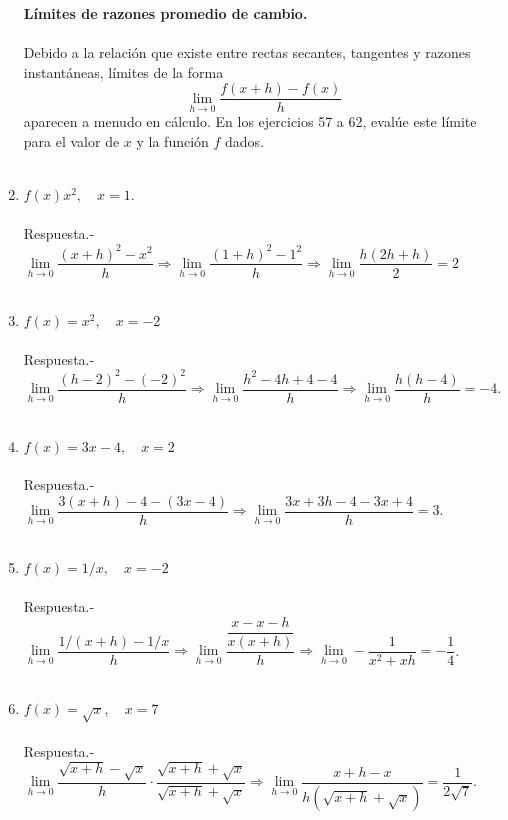 \begin{enumerate}
\textbf{Límites de razones promedio de cambio.}\\\\
Debido a la relación que existe entre rectas secantes, tangentes y razones instantáneas, límites de la forma
$$\lim\limits_{h\to 0}\dfrac{f(x + h) - f(x)}{h}$$
aparecen a menudo en cálculo. En los ejercicios 57 a 62, evalúe este
límite para el valor de $x$ y la función $f$ dados.\\\\

\item $f(x)x^2, \quad x=1$.\\\\
    Respuesta.-\; $\lim\limits_{h\to 0} \dfrac{(x+h)^2-x^2}{h} \Longrightarrow \lim\limits_{h\to 0} \dfrac{(1+h)^2-1^2}{h} \Longrightarrow \lim\limits_{h\to 0} \dfrac{h(2h+h)}{2} = 2$\\\\

\item $f(x) = x^2, \quad x=-2$\\\\
    Respuesta.-\; $\lim\limits_{h\to 0} \dfrac{(h-2)^2 - (-2)^2}{h} \Longrightarrow \lim\limits_{h\to 0} \dfrac{h^2 - 4h + 4 - 4}{h} \Longrightarrow \lim\limits_{h \to 0} \dfrac{h(h-4)}{h} = -4$.\\\\ 

\item $f(x) = 3x-4, \quad x=2$\\\\
    Respuesta.-\; $\lim\limits_{h\to 0} \dfrac{3(x+h)-4 -(3x-4)}{h} \Longrightarrow \lim\limits_{h\to 0} \dfrac{3x+3h - 4 -3x + 4}{h} = 3$.\\\\ 

\item $f(x) = 1/x , \quad x=-2$\\\\
    Respuesta.-\; $\lim\limits_{h\to 0} \dfrac{1/(x+h) - 1/x}{h} \Longrightarrow \lim\limits_{h\to 0} \dfrac{\dfrac{x-x-h}{x(x+h)}}{h} \Longrightarrow \lim\limits_{h\to 0} -\dfrac{1}{x^2+xh} = -\dfrac{1}{4}$.\\\\ 

\item $f(x) = \sqrt{x}, \quad x=7$\\\\
    Respuesta.-\; $\lim\limits_{h\to 0} \dfrac{\sqrt{x+h}-\sqrt{x}}{h}  \cdot\dfrac{\sqrt{x+h}+\sqrt{x}}{\sqrt{x+h}+\sqrt{x}} \Longrightarrow \lim\limits_{h\to 0} \dfrac{x+h - x}{h\left(\sqrt{x+h}+\sqrt{x}\right)} = \dfrac{1}{2\sqrt{7}}$.\\\\ 


\end{enumerate}
